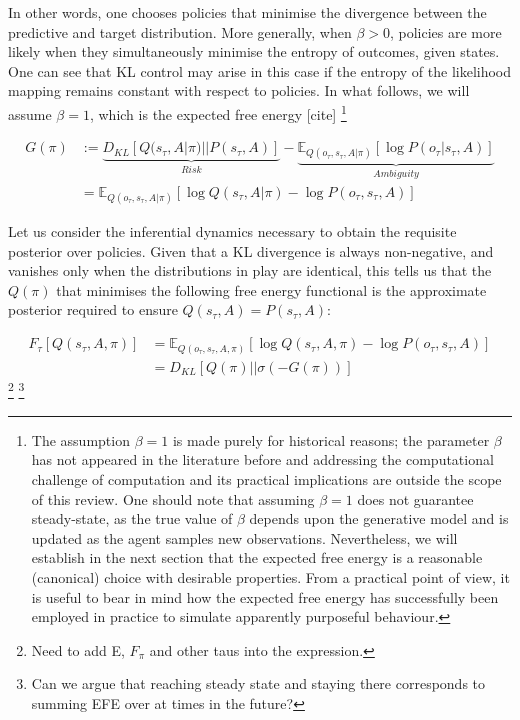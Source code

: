 \documentclass{article}
\theoremstyle{plain}
\theoremstyle{definition}
\theoremstyle{proposition}
\theoremstyle{corollary}
\theoremstyle{lemma}
\theoremstyle{remark}
\theoremstyle{example}
\begin{document}
In other words, one chooses policies that minimise the divergence between the predictive and target distribution. More generally, when $\beta >0$, policies are more likely when they simultaneously minimise the entropy of outcomes, given states. One can see that KL control may arise in this case if the entropy of the likelihood mapping remains constant with respect to policies. 
In what follows, we will assume $\beta=1$, which is the expected free energy [cite] \footnote{The assumption $\beta =1$ is made purely for historical reasons; the parameter $\beta$ has not appeared in the literature before and addressing the computational challenge of computation and its practical implications are outside the scope of this review. One should note that assuming $\beta =1$ does not guarantee steady-state, as the true value of $\beta$ depends upon the generative model and is updated as the agent samples new observations. Nevertheless, we will establish in the next section that the expected free energy is a reasonable (canonical) choice with desirable properties. From a practical point of view, it is useful to bear in mind how the expected free energy has successfully been employed in practice to simulate apparently purposeful behaviour.}

\begin{equation}
    \begin{split}
            G(\pi) & :=  \underbrace{ D_{KL}[Q(s_\tau, A|\pi)||P(s_\tau, A)]}_{Risk}- \underbrace{\mathbb E_{Q(o_\tau,s_\tau, A|\pi)}[ \log P(o_\tau |s_\tau, A)]}_{Ambiguity}\\
    &= \mathbb E_{Q(o_\tau,s_\tau,A|\pi)}[\log Q(s_\tau, A|\pi)-\log P(o_\tau, s_\tau, A)] 
    \end{split}
\end{equation}



Let us consider the inferential dynamics necessary to obtain the requisite posterior over policies. Given that a KL divergence is always non-negative, and vanishes only when the distributions in play are identical, this tells us that the $Q(\pi)$ that minimises the following free energy functional is the approximate posterior required to ensure $Q(s_\tau, A) = P(s_\tau, A)$:

\begin{equation}
\label{eqfe}
    \begin{split}
        F_\tau [Q(s_\tau,  A, \pi)]&= \mathbb E_{Q(o_\tau, s_\tau, A, \pi)}[\log Q(s_\tau, A, \pi)- \log P(o_\tau, s_\tau, A)] \\
        &=D_{KL}[Q(\pi)||\sigma(-G(\pi))]
    \end{split}
\end{equation}
\footnote{Need to add E, $F_\pi$ and other taus into the expression.}
\footnote{Can we argue that reaching steady state and staying there corresponds to summing EFE over at times in the future?}
\end{document}
